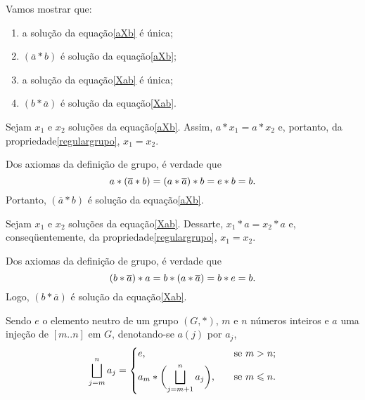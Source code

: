 \begin{dem}
  Vamos mostrar que:
  \begin{enumerate}
    \item a solução da equação\xspace\ref{aXb} é única;
    \item $(\overline{a}\ast b)$ é solução da equação\xspace\ref{aXb};
    \item a solução da equação\xspace\ref{Xab} é única;
    \item $(b\ast \overline{a})$ é solução da equação\xspace\ref{Xab}.
  \end{enumerate}

  Sejam $x_1$ e $x_2$ soluções da equação\xspace\ref{aXb}. Assim,
  $a\ast x_1=a\ast x_2$ e, portanto, da
  propriedade\xspace\ref{regulargrupo},
  $x_1=x_2$.

  Dos axiomas da definição de grupo, é verdade que
  \begin{equation*}
    a\ast (\overline{a}\ast b) = (a\ast \overline{a})\ast b
    = e\ast b = b\mathrm{.}
  \end{equation*}
  Portanto, $(\overline{a}\ast b)$ é solução da equação\xspace\ref{aXb}.

  Sejam $x_1$ e $x_2$ soluções da equação\xspace\ref{Xab}. Dessarte,
  $x_1\ast a=x_2\ast a$ e, conseqüentemente, da
  propriedade\xspace\ref{regulargrupo},
  $x_1=x_2$.

  Dos axiomas da definição de grupo, é verdade que
  \begin{equation*}
    (b\ast \overline{a})\ast a = b\ast (a\ast \overline{a})
    = b\ast e = b\mathrm{.}
  \end{equation*}
  Logo, $(b\ast \overline{a})$ é solução da equação\xspace\ref{Xab}.
\end{dem}

\begin{Not}\label{estrelatorio}
  Sendo $e$ o elemento neutro de um grupo $(G,\ast )$, $m$ e $n$ números
  inteiros e $a$ uma injeção de $[m..n]$ em $G$, denotando-se $a(j)$ por
  $a_j$,
  \begin{equation*}
    \simb[$a_m\ast a_{m+1}\ast\dotsb\ast a_n$]{\bigsqcup_{j=m}^na_j} =
    \left\{
      \begin{aligned}
        &e\MMv\quad&\text{se $m>n$;}\\
        &a_m\ast \biggl(\bigsqcup_{j=m+1}^na_j\biggr)
          \MMv\quad&\text{se $m\leq n$.}
      \end{aligned}
    \right.
  \end{equation*}
\end{Not}

